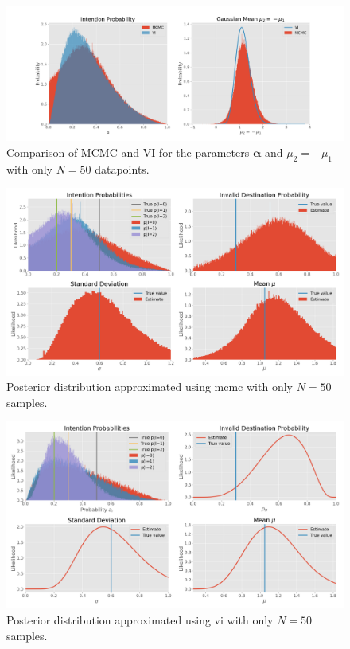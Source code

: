 \begin{figure}[h]
    \centering
    \includegraphics[width=\textwidth]{figures/example_vi_mcmc_comparison_low_N.png}
    \caption{Comparison of MCMC and VI for the parameters $\boldsymbol{\alpha}$ and $\mu_2 = -\mu_1$ with only $N=50$ datapoints.}
    \label{fig:example_mcmc_vi_low_N}
\end{figure}

\begin{figure}[h]
    \centering
    \includegraphics[width=\textwidth]{figures/example_mcmc_low_N.png}
    \caption{Posterior distribution approximated using \acrshort{mcmc} with only $N=50$ samples.}
    \label{fig:example_mcmc_low_N}
\end{figure}

\begin{figure}[h]
    \centering
    \includegraphics[width=\textwidth]{figures/example_vi_low_N.png}
    \caption{Posterior distribution approximated using \acrshort{vi} with only $N=50$ samples.}
    \label{fig:example_vi_low_N}
\end{figure}

